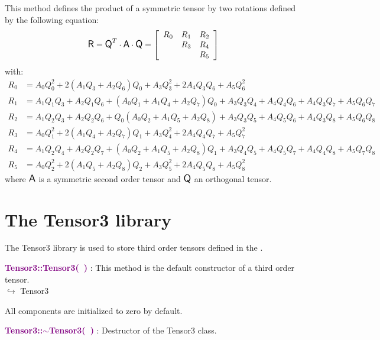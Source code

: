 This method defines the product of a symmetric tensor by two rotations defined by the following equation:
\begin{equation*}
\mbox{\large\ensuremath{\mathsf{R}}} = \mbox{\large\ensuremath{\mathsf{Q}}}^T \cdot \mbox{\large\ensuremath{\mathsf{A}}} \cdot \mbox{\large\ensuremath{\mathsf{Q}}} =\left[\begin{array}{ccc}
R_0&R_1&R_2\\
&R_3&R_4\\
&&R_5
\end{array}\right]
\end{equation*}
with:
\begin{align*}
R_0 &= A_0 Q_0^2 + 2 (A_1 Q_3 + A_2 Q_6) Q_0 + A_3 Q_3^2 + 2 A_4 Q_3 Q_6 + A_5 Q_6^2 \\
R_1 &= A_1 Q_1 Q_3 +A_2 Q_1 Q_6 + (A_0 Q_1 + A_1 Q_4 + A_2 Q_7) Q_0+ A_3 Q_3 Q_4 + A_4 Q_4 Q_6 + A_4 Q_3 Q_7 + A_5 Q_6 Q_7\\
R_2 &= A_1 Q_2 Q_3 + A_2 Q_2 Q_6 + Q_0 (A_0 Q_2 + A_1 Q_5 + A_2 Q_8) + A_3 Q_3 Q_5 + A_4 Q_5 Q_6 + A_4 Q_3 Q_8 + A_5 Q_6 Q_8\\
R_3 &= A_0 Q_1^2 + 2 (A_1 Q_4 + A_2 Q_7)Q_1 + A_3 Q_4^2 + 2 A_4 Q_4 Q_7 + A_5 Q_7^2\\
R_4 &= A_1 Q_2 Q_4 + A_2 Q_2 Q_7 + (A_0 Q_2 + A_1 Q_5 + A_2 Q_8)Q_1 + A_3 Q_4 Q_5 + A_4 Q_5 Q_7 + A_4 Q_4 Q_8 + A_5 Q_7 Q_8\\
R_5 &= A_0 Q_2^2 + 2 (A_1 Q_5 + A_2 Q_8) Q_2 + A_3 Q_5^2 + 2 A_4 Q_5 Q_8 + A_5 Q_8^2
\end{align*}
where $\mbox{\large\ensuremath{\mathsf{A}}}$ is a symmetric second order tensor and $\mbox{\large\ensuremath{\mathsf{Q}}}$ an orthogonal tensor.

\section{The Tensor3 library}

The Tensor3 library is used to store third order tensors defined in the \DynELA.

\textcolor{purple}{\textbf{Tensor3::Tensor3(~)}}\label{Tensor3::Tensor3()} : This method is the default constructor of a third order tensor.\\ \hspace*{5mm}$\hookrightarrow$ Tensor3

All components are initialized to zero by default.

\textcolor{purple}{\textbf{Tensor3::$\sim$Tensor3(~)}}\label{Tensor3::~Tensor3()} : Destructor of the Tensor3 class.

